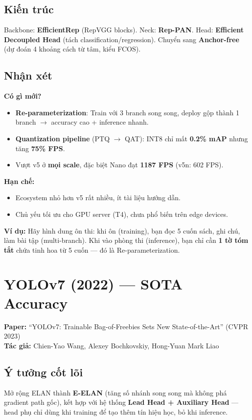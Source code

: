 \documentclass[12pt,a4paper]{report}
\begin{document}
\subsection{Kiến trúc}
Backbone: \textbf{EfficientRep} (RepVGG blocks). Neck: \textbf{Rep-PAN}. Head: \textbf{Efficient Decoupled Head} (tách classification/regression). Chuyển sang \textbf{Anchor-free} (dự đoán 4 khoảng cách từ tâm, kiểu FCOS).

\subsection{Nhận xét}

\textbf{Có gì mới?}
\begin{itemize}
    \item \textbf{Re-parameterization}: Train với 3 branch song song, deploy gộp thành 1 branch $\rightarrow$ accuracy cao + inference nhanh.
    \item \textbf{Quantization pipeline} (PTQ $\rightarrow$ QAT): INT8 chỉ mất \textbf{0.2\% mAP} nhưng tăng \textbf{75\% FPS}.
    \item Vượt v5 ở \textbf{mọi scale}, đặc biệt Nano đạt \textbf{1187 FPS} (v5n: 602 FPS).
\end{itemize}

\textbf{Hạn chế:}
\begin{itemize}
    \item Ecosystem nhỏ hơn v5 rất nhiều, ít tài liệu hướng dẫn.
    \item Chủ yếu tối ưu cho GPU server (T4), chưa phổ biến trên edge devices.
\end{itemize}

\textbf{Ví dụ:} Hãy hình dung ôn thi: khi ôn (training), bạn đọc 5 cuốn sách, ghi chú, làm bài tập (multi-branch). Khi vào phòng thi (inference), bạn chỉ cần \textbf{1 tờ tóm tắt} chứa tinh hoa từ 5 cuốn --- đó là Re-parameterization.

\section{YOLOv7 (2022) --- SOTA Accuracy}
\textbf{Paper:} ``YOLOv7: Trainable Bag-of-Freebies Sets New State-of-the-Art'' (CVPR 2023)\\
\textbf{Tác giả:} Chien-Yao Wang, Alexey Bochkovskiy, Hong-Yuan Mark Liao

\subsection{Ý tưởng cốt lõi}
Mở rộng ELAN thành \textbf{E-ELAN} (tăng số nhánh song song mà không phá gradient path gốc), kết hợp với hệ thống \textbf{Lead Head + Auxiliary Head} --- head phụ chỉ dùng khi training để tạo thêm tín hiệu học, bỏ khi inference.
\end{document}
